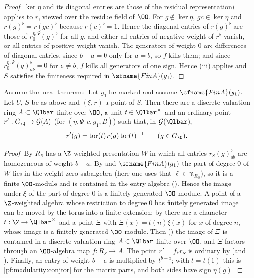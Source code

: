 \begin{proof}
$\ker\eta$ and its diagonal entries are those of the residual representation) applies to $r$, viewed over the residue
field of $\OO$. For $g\notin\ker\eta$, $gc\in\ker\eta$ and $r(g)^\flat=r(gc)^\flat$ because $r(c)^\flat=1$. Hence the
diagonal entries of $r(g)^\flat$ are those of $r_0^{\eta,\Psi}(g)^\flat$ for all $g$, and either all entries of
negative weight of $r^\flat$ vanish, or all entries of positive weight vanish. The
generators of weight $0$ are differences of diagonal entries, since $b-a=0$ only for $a=b$, so $f$ kills them; and
since $r_0^{\eta,\Psi}(g)^\flat_{ab}=0$ for $a\ne b$, $f$ kills all generators of one sign. Hence (iii) applies and
$S$ satisfies the finiteness required in $\sfname{FinA}(g_1)$.
\end{proof}

\begin{lemma}\label{pf:modularity:ordpt}
Assume the local theorems. Let $g_1$ be marked and assume $\sfname{FinA}(g_1)$. Let $U$, $S$ be as above and
$(\xi,r)$ a point of $S$. Then there are a discrete valuation ring $A\subset\Qlbar$ finite over $\OO$, a unit
$t\in\Qlbar^\times$ and an ordinary point $r':G_\Q\to\modularityG(A)$ (for $(\eta,\Psi,c,g_1,B)$) such that, in
$\modularityG(\Qlbar)$,
\begin{equation}\label{pf:modularity:conjtor}
r'(g)=\mathrm{tor}(t)\,r(g)\,\mathrm{tor}(t)^{-1}\qquad(g\in G_\Q).
\end{equation}
\end{lemma}

\begin{proof}
By  $R_S$ has a $\Z$-weighted presentation $W$ in which all entries $r_S(g)^\flat_{ab}$ are
homogeneous of weight $b-a$. By  and $\sfname{FinA}(g_1)$ the part of degree $0$ of $W$ lies in
the weight-zero subalgebra (here one uses that $\ell\in\mathfrak m_{R_S}$), so it is a finite $\OO$-module and is
contained in the entry algebra (). Hence the image under $\xi$ of the part of degree $0$ is a finitely
generated $\OO$-module. A point of a $\Z$-weighted algebra whose restriction to degree $0$ has finitely generated
image can be moved by the torus into a finite extension: by  there are a
character $t:\Z\to\Qlbar^\times$ and a point $\Xi$ with $\Xi(x)=t(n)\xi(x)$ for $x$ of degree $n$, whose image is a
finitely generated $\OO$-module. Then () the image of $\Xi$ is contained in a discrete
valuation ring $A\subset\Qlbar$ finite over $\OO$, and $\Xi$ factors through an $\OO$-algebra map $f:R_S\to A$. The
point $r'=f_\ast r_S$ is ordinary by  (and ). Finally,
an entry of weight $b-a$ is multiplied by $t^{b-a}$; with $t=t(1)$ this is \eqref{pf:modularity:conjtor} for the matrix
parts, and both sides have sign $\eta(g)$.
\end{proof}

